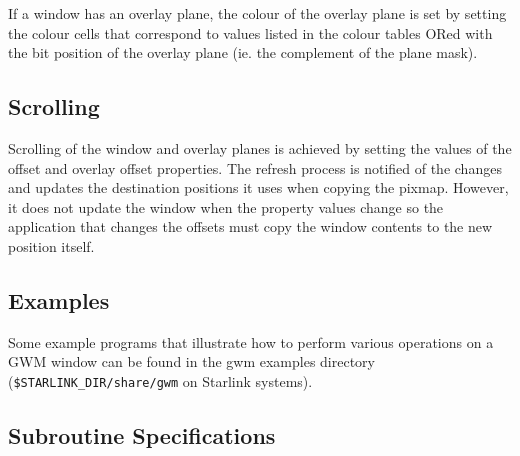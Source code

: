 \documentclass[twoside,11pt,nolof]{starlink}
\begin{document}
If a window has an overlay plane, the colour of the overlay plane is set
by setting the colour cells that correspond to values listed in the
colour tables ORed with the bit position of the overlay plane (ie. the
complement of the plane mask).

\subsection{Scrolling}
Scrolling of the window and overlay planes is achieved by setting the
values of the offset and overlay offset properties. The refresh process
is notified of the changes and updates the destination positions it uses
when copying the pixmap. However, it does not update the window when the
property values change so the application that changes the offsets must
copy the window contents to the new position itself.

\subsection{Examples}

Some example programs that illustrate how to perform various operations on a
GWM window can be found in the gwm examples directory
(\texttt{\$STARLINK\_DIR/share/gwm}
on Starlink systems).

\newpage
\subsection{Subroutine Specifications}
\end{document}
